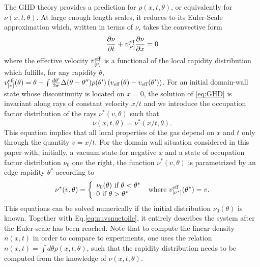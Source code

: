 \documentclass[submission, Phys]{SciPost}
\begin{document}
The GHD theory provides a prediction for
$\rho(x,t,\theta)$, or equivalently for $\nu (x,t,\theta)$. At large enough length scales, it reduces to its Euler-Scale approximation which, written in terms of $\nu$, takes the convective form 
\begin{equation}
\label{eq:GHD}
\frac{\partial\nu}{\partial t} + v^{\rm{eff}}_{[\nu]}\frac{\partial  \nu }{\partial x} = 0
\end{equation}
where the effective velocity $v^{\rm{eff}}_{[\nu]}$ is a functional of the local rapidity distribution which fulfills, for any rapidity $\theta$,
$v_{[\nu]}^{\rm{eff}}(\theta) = \theta -\int \frac{d\theta'}{2\pi} \Delta(\theta-\theta'') \rho(\theta')\left (  v_{\rm{eff}}(\theta) - v_{\rm{eff}}(\theta') \right )$.
For an initial domain-wall state whose discontinuity is located on $x=0$, the solution of \eqref{eq:GHD} is invariant along rays of constant velocity $x/t$ and we introduce the occupation factor distribution of the rays $\nu^*(v,\theta)$ such that 
\begin{equation}
\label{eq:nuvsnuetoile}
    \nu(x,t,\theta)=\nu^*( x/t,\theta).
    \label{eq:euler}
\end{equation} 
This equation implies that all local properties of the gas depend on $x$ and $t$ only through the quantity $v=x/t$. 
For the domain wall situation considered in this paper with, initially, a  vacuum state for negative $x$ and 
a state of occupation factor distribution $\nu_0$ one the right, 
 the function $\nu^*(v,\theta)$ is parametrized by an edge rapidity $\theta^*$ according to
\begin{equation}
\label{eq:nuetoile}
    \nu^*(v,\theta)=\left \{ \begin{array}{l} 
    \nu_0(\theta) \mbox{ if } \theta < \theta^*\\
    0 \mbox{ if } \theta > \theta^*\\
    \end{array} \right . \mbox{ where  }  v^{\rm{eff}}_{[\nu^*]}(\theta^*)=v.
\end{equation}
This equations can be solved numerically 
if the initial distribution $\nu_0(\theta)$ is known. Together with Eq.\eqref{eq:nuvsnuetoile}, it entirely describes the system after the Euler-scale has been 
reached. Note that to compute the linear density $n(x,t)$ in order to compare to experiments,  one
uses the relation $n(x,t)=\int d\theta \rho(x,t,\theta)$, such that the rapidity distribution
needs to be computed from the knowledge of $\nu(x,t,\theta)$.
\end{document}
